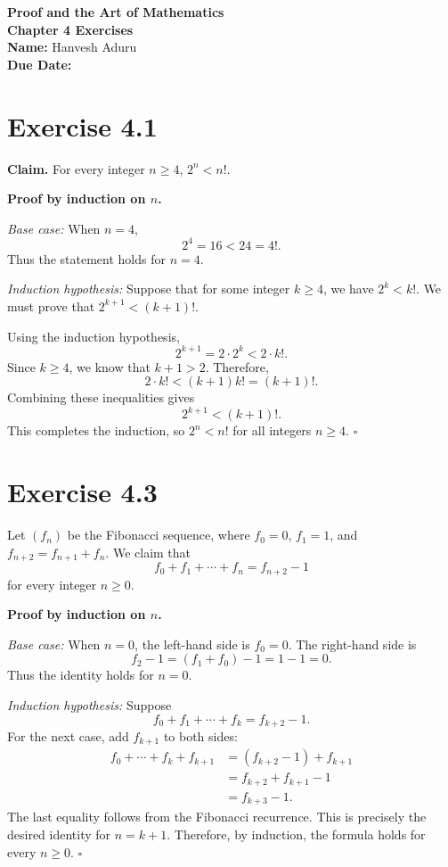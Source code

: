 \documentclass[11pt]{article}
\newcommand{\qed}{\hfill$\square$}
\begin{document}
\begin{center}
    {\Large\textbf{Proof and the Art of Mathematics}}\\[4pt]
    {\large\textbf{Chapter 4 Exercises}}\\[10pt]
    \textbf{Name:} Hanvesh Aduru\\[4pt]
    \textbf{Due Date:} \underline{\hspace{1.8in}}
\end{center}

\section*{Exercise 4.1}

\textbf{Claim.} For every integer $n\geq 4$, $2^n<n!$.

\textbf{Proof by induction on $n$.}

\textit{Base case:} When $n=4$,
\[
2^4=16<24=4!.
\]
Thus the statement holds for $n=4$.

\textit{Induction hypothesis:} Suppose that for some integer
$k\geq 4$, we have $2^k<k!$. We must prove that
$2^{k+1}<(k+1)!$.

Using the induction hypothesis,
\[
2^{k+1}=2\cdot 2^k<2\cdot k!.
\]
Since $k\geq 4$, we know that $k+1>2$. Therefore,
\[
2\cdot k!<(k+1)k!=(k+1)!.
\]
Combining these inequalities gives
\[
2^{k+1}<(k+1)!.
\]
This completes the induction, so $2^n<n!$ for all
integers $n\geq 4$. \qed

\section*{Exercise 4.3}

Let $(f_n)$ be the Fibonacci sequence, where
$f_0=0$, $f_1=1$, and
$f_{n+2}=f_{n+1}+f_n$. We claim that
\[
f_0+f_1+\cdots+f_n=f_{n+2}-1
\]
for every integer $n\geq 0$.

\textbf{Proof by induction on $n$.}

\textit{Base case:} When $n=0$, the left-hand side is
$f_0=0$. The right-hand side is
\[
f_2-1=(f_1+f_0)-1=1-1=0.
\]
Thus the identity holds for $n=0$.

\textit{Induction hypothesis:} Suppose
\[
f_0+f_1+\cdots+f_k=f_{k+2}-1.
\]
For the next case, add $f_{k+1}$ to both sides:
\begin{align*}
f_0+\cdots+f_k+f_{k+1}
&=(f_{k+2}-1)+f_{k+1}\\
&=f_{k+2}+f_{k+1}-1\\
&=f_{k+3}-1.
\end{align*}
The last equality follows from the Fibonacci recurrence.
This is precisely the desired identity for $n=k+1$.
Therefore, by induction, the formula holds for every
$n\geq 0$. \qed
\end{document}
